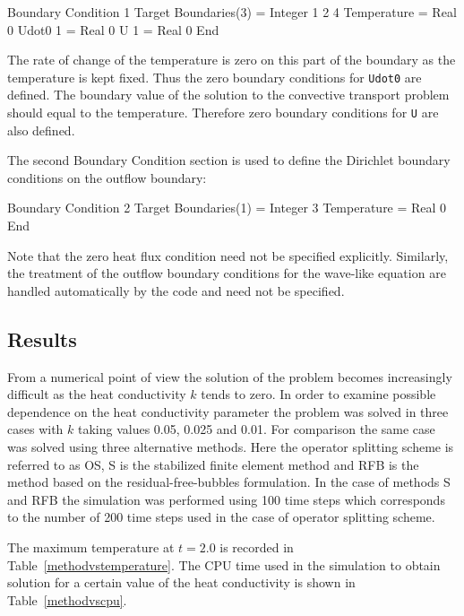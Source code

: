 \ttbegin
Boundary Condition 1
  Target Boundaries(3) = Integer 1 2 4 
  Temperature = Real 0
  Udot0 1 = Real 0
  U 1 = Real 0
End
\ttend

The rate of change of the temperature is zero on this part of the boundary 
as the temperature is kept fixed. Thus the zero boundary 
conditions for {\tt Udot0} are defined. The boundary value of the 
solution to the convective transport problem should equal to the
temperature. Therefore zero boundary conditions for {\tt U} are also defined.
  
The second Boundary Condition section is used to define the Dirichlet boundary 
conditions on the outflow boundary: 

\ttbegin
Boundary Condition 2
  Target Boundaries(1) = Integer 3
  Temperature = Real 0
End
\ttend

Note that the zero heat flux condition
need not be specified explicitly. Similarly, the treatment of 
the outflow boundary conditions for the wave-like
equation are handled automatically by the code and need not be specified. 


\subsection*{Results}

From a numerical point of view the solution of the problem becomes 
increasingly difficult as the heat conductivity $k$ tends to zero. 
In order to examine possible dependence on the heat conductivity parameter
the problem was solved in three cases with $k$ taking values 0.05, 0.025 
and 0.01. For comparison the same case was solved using three alternative 
methods. Here the operator splitting scheme is referred to as OS, S is the 
stabilized finite element method and RFB is the method based on the 
residual-free-bubbles formulation. In the case of methods S and RFB the 
simulation was performed using 100 time steps which corresponds to the number 
of 200 time steps used in the case of operator splitting scheme.
 
The maximum temperature at $t=2.0$ is recorded in 
Table~\ref{methodvstemperature}. The CPU time used in the simulation to
obtain solution for a certain value of the heat conductivity is
shown in Table~\ref{methodvscpu}.
   
